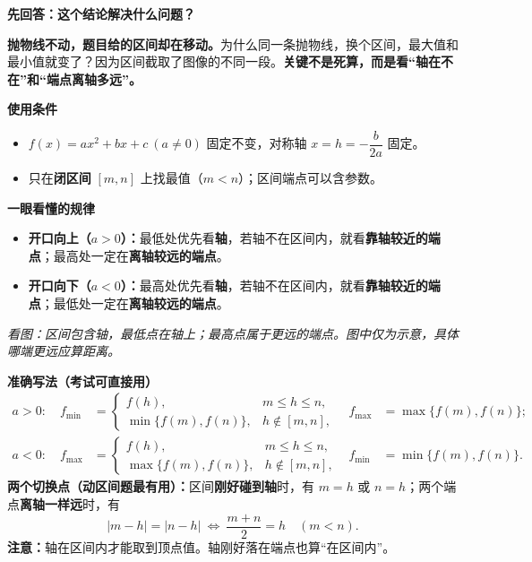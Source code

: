 \begin{statementbox}
\textbf{\textcolor{CStatement}{先回答：这个结论解决什么问题？}}

\textbf{抛物线不动，题目给的区间却在移动。}为什么同一条抛物线，换个区间，最大值和最小值就变了？因为区间截取了图像的不同一段。\textbf{关键不是死算，而是看“轴在不在”和“端点离轴多远”。}

\medskip
\textbf{\textcolor{CStatement}{使用条件}}
\begin{itemize}[leftmargin=*,itemsep=0.2em]
  \item $f(x)=ax^2+bx+c\ (a\ne0)$ 固定不变，对称轴 $x=h=-\dfrac{b}{2a}$ 固定。
  \item 只在\textbf{闭区间} $[m,n]$ 上找最值（$m<n$）；区间端点可以含参数。
\end{itemize}

\textbf{\textcolor{CStatement}{一眼看懂的规律}}
\begin{itemize}[leftmargin=*,itemsep=0.2em]
  \item \textbf{开口向上（$a>0$）：}最低处优先看\textbf{轴}，若轴不在区间内，就看\textbf{靠轴较近的端点}；最高处一定在\textbf{离轴较远的端点}。
  \item \textbf{开口向下（$a<0$）：}最高处优先看\textbf{轴}，若轴不在区间内，就看\textbf{靠轴较近的端点}；最低处一定在\textbf{离轴较远的端点}。
\end{itemize}

\begin{center}

\end{center}
\noindent\textit{看图：区间包含轴，最低点在轴上；最高点属于更远的端点。图中仅为示意，具体哪端更远应算距离。}

\medskip
\textbf{\textcolor{CStatement}{准确写法（考试可直接用）}}
\[
\begin{aligned}
 a>0:\quad
 f_{\min}&=
 \begin{cases} f(h),&m\le h\le n,\\ \min\{f(m),f(n)\},&h\notin[m,n],\end{cases}
 &f_{\max}&=\max\{f(m),f(n)\};\\[3pt]
 a<0:\quad
 f_{\max}&=
 \begin{cases} f(h),&m\le h\le n,\\ \max\{f(m),f(n)\},&h\notin[m,n],\end{cases}
 &f_{\min}&=\min\{f(m),f(n)\}.
\end{aligned}
\]
\textbf{两个切换点（动区间题最有用）：}区间\textbf{刚好碰到轴}时，有 $m=h$ 或 $n=h$；两个端点\textbf{离轴一样远}时，有
\[
 |m-h|=|n-h|\ \Longleftrightarrow\ \boxed{\frac{m+n}{2}=h}\quad(m<n).
\]
\textbf{注意：}轴在区间内才能取到顶点值。轴刚好落在端点也算“在区间内”。
\end{statementbox}
